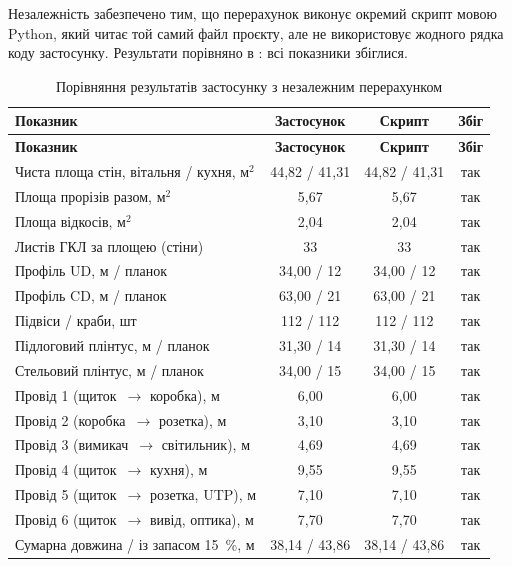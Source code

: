 Незалежність забезпечено тим, що перерахунок виконує окремий скрипт мовою Python, який читає той самий файл проєкту, але не використовує жодного рядка коду застосунку. Результати порівняно в : всі показники збіглися.

\begin{spacing}{1.15}
\small\noindent
\begin{xltabular}{\textwidth}{| >{\raggedright\arraybackslash}X | c | c | c |}
    \caption{Порівняння результатів застосунку з незалежним перерахунком} \label{tab:verify} \\
    \hline
    \textbf{Показник} & \textbf{Застосунок} & \textbf{Скрипт} & \textbf{Збіг} \\ \hline
    \endfirsthead

    \hline
    \textbf{Показник} & \textbf{Застосунок} & \textbf{Скрипт} & \textbf{Збіг} \\ \hline
    \endhead

    Чиста площа стін, вітальня / кухня, м$^2$ & 44,82 / 41,31 & 44,82 / 41,31 & так \\ \hline
    Площа прорізів разом, м$^2$ & 5,67 & 5,67 & так \\ \hline
    Площа відкосів, м$^2$ & 2,04 & 2,04 & так \\ \hline
    Листів ГКЛ за площею (стіни) & 33 & 33 & так \\ \hline
    Профіль UD, м / планок & 34,00 / 12 & 34,00 / 12 & так \\ \hline
    Профіль CD, м / планок & 63,00 / 21 & 63,00 / 21 & так \\ \hline
    Підвіси / краби, шт & 112 / 112 & 112 / 112 & так \\ \hline
    Підлоговий плінтус, м / планок & 31,30 / 14 & 31,30 / 14 & так \\ \hline
    Стельовий плінтус, м / планок & 34,00 / 15 & 34,00 / 15 & так \\ \hline
    Провід 1 (щиток~$\to$ коробка), м & 6,00 & 6,00 & так \\ \hline
    Провід 2 (коробка~$\to$ розетка), м & 3,10 & 3,10 & так \\ \hline
    Провід 3 (вимикач~$\to$ світильник), м & 4,69 & 4,69 & так \\ \hline
    Провід 4 (щиток~$\to$ кухня), м & 9,55 & 9,55 & так \\ \hline
    Провід 5 (щиток~$\to$ розетка, UTP), м & 7,10 & 7,10 & так \\ \hline
    Провід 6 (щиток~$\to$ вивід, оптика), м & 7,70 & 7,70 & так \\ \hline
    Сумарна довжина / із запасом 15~\%, м & 38,14 / 43,86 & 38,14 / 43,86 & так \\ \hline
\end{xltabular}
\end{spacing}

